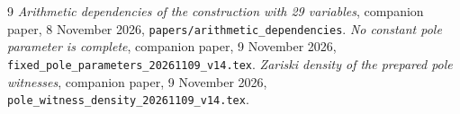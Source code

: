 \documentclass[11pt,a4paper]{article}
\begin{document}
\begin{thebibliography}{9}
\emph{Arithmetic dependencies of the construction with 29 variables},
companion paper, 8 November 2026,
\nolinkurl{papers/arithmetic_dependencies}.
\emph{No constant pole parameter is complete},
companion paper, 9 November 2026,
\nolinkurl{fixed_pole_parameters_20261109_v14.tex}.
\emph{Zariski density of the prepared pole witnesses},
companion paper, 9 November 2026,
\nolinkurl{pole_witness_density_20261109_v14.tex}.
\end{thebibliography}
\end{document}
